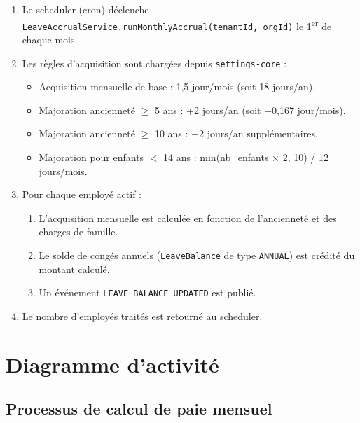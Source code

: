 \documentclass[a4paper,12pt,openany]{book}
\begin{document}
    \begin{enumerate}
        \item Le scheduler (cron) déclenche \texttt{LeaveAccrualService.runMonthlyAccrual(tenantId, orgId)} le 1\textsuperscript{er} de chaque mois.

        \item Les règles d'acquisition sont chargées depuis \texttt{settings-core} :
        \begin{itemize}
            \item Acquisition mensuelle de base : 1,5 jour/mois (soit 18 jours/an).
            \item Majoration ancienneté $\geq$ 5 ans : +2 jours/an (soit +0,167 jour/mois).
            \item Majoration ancienneté $\geq$ 10 ans : +2 jours/an supplémentaires.
            \item Majoration pour enfants $<$ 14 ans : min(nb\_enfants $\times$ 2, 10) / 12 jours/mois.
        \end{itemize}

        \item Pour chaque employé actif :
        \begin{enumerate}[label=\alph*.]
    \item L'acquisition mensuelle est calculée en fonction de l'ancienneté et des charges de famille.
    \item Le solde de congés annuels (\texttt{LeaveBalance} de type \texttt{ANNUAL}) est crédité du montant calculé.
    \item Un événement \texttt{LEAVE\_BALANCE\_UPDATED} est publié.
        \end{enumerate}

        \item Le nombre d'employés traités est retourné au scheduler.
    \end{enumerate}


    \chapter{Diagramme d'activité}

    \section{Processus de calcul de paie mensuel}
\end{document}
